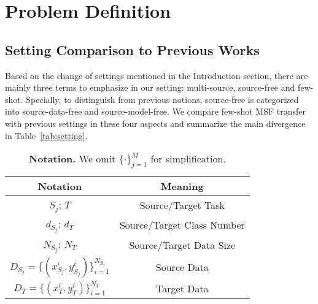 \documentclass[letterpaper]{article} %
\begin{document}
\section{Problem Definition}

\subsection{Setting Comparison to Previous Works}

Based on the change of settings mentioned in the Introduction section, there are mainly three terms to emphasize in our setting: multi-source, source-free and few-shot. Specially, to distinguish from previous notions, source-free is categorized into source-data-free and source-model-free. We compare few-shot MSF transfer with previous settings in these four aspects and summarize the main divergence in Table~\ref{tab:setting}. 


 \begin{table}[!ht]
     \renewcommand{\arraystretch}{1.2}
    \centering
    \begin{tabular}{c |c }
        \toprule
        \textbf{Notation} & \textbf{Meaning}\\
        \midrule
        $S_j$; $T$ & Source/Target Task\\
        $d_{S_j}$; $d_T$& Source/Target Class Number\\
     $N_{S_j}$; $N_T$ & Source/Target Data Size \\
         $D_{S_j} = \{(x_{S_j}^i, y_{S_j}^i)\}_{i = 1}^{N_{S_j}}$ & Source Data \\
         $D_T = \{(x_T^i, y_T^i)\}_{i = 1}^{N_T}$ & Target Data \\
          \bottomrule
    \end{tabular}
    \caption{\textbf{Notation.} We omit $\{\cdot\}_{j=1}^M$ for simplification.}
    \label{tab:notation}
\end{table}
\end{document}
